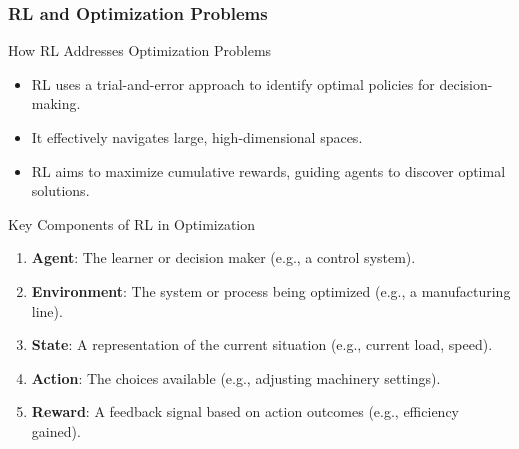 \documentclass[aspectratio=169]{beamer}
\begin{document}
\begin{frame}[fragile]
  \frametitle{RL and Optimization Problems}
  \begin{block}{How RL Addresses Optimization Problems}
    \begin{itemize}
      \item RL uses a trial-and-error approach to identify optimal policies for decision-making.
      \item It effectively navigates large, high-dimensional spaces.
      \item RL aims to maximize cumulative rewards, guiding agents to discover optimal solutions.
    \end{itemize}
  \end{block}

  \begin{block}{Key Components of RL in Optimization}
    \begin{enumerate}
      \item \textbf{Agent}: The learner or decision maker (e.g., a control system).
      \item \textbf{Environment}: The system or process being optimized (e.g., a manufacturing line).
      \item \textbf{State}: A representation of the current situation (e.g., current load, speed).
      \item \textbf{Action}: The choices available (e.g., adjusting machinery settings).
      \item \textbf{Reward}: A feedback signal based on action outcomes (e.g., efficiency gained).
    \end{enumerate}
  \end{block}
\end{frame}
\end{document}
